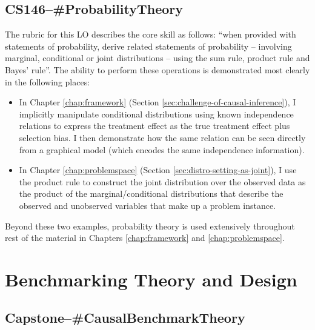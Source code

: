 \documentclass[../main.tex]{subfiles}
\begin{document}

\subsection*{\textbf{CS146--\#ProbabilityTheory}}
\label{lo:ProbabilityTheory}

The rubric for this LO describes the core skill as follows: ``when provided with statements of probability, derive related statements of probability – involving marginal, conditional or joint distributions – using the sum rule, product rule and Bayes' rule''. The ability to perform these operations is demonstrated most clearly in the following places:

\begin{itemize}
    \item In Chapter \ref{chap:framework} (Section \ref{sec:challenge-of-causal-inference}), I implicitly manipulate conditional distributions using known independence relations to express the treatment effect as the true treatment effect plus selection bias. I then demonstrate how the same relation can be seen directly from a graphical model (which encodes the same independence information).
    
    \item In Chapter \ref{chap:problemspace} (Section \ref{sec:distro-setting-as-joint}), I use the product rule to construct the joint distribution over the observed data as the product of the marginal/conditional distributions  that describe the observed and unobserved variables that make up a problem instance.
\end{itemize}

Beyond these two examples, probability theory is used extensively throughout rest of the material in Chapters \ref{chap:framework} and \ref{chap:problemspace}.


\section{Benchmarking Theory and Design}

\subsection*{\textbf{Capstone--\#CausalBenchmarkTheory}}
\label{lo:CausalBenchmarkTheory}
\end{document}
